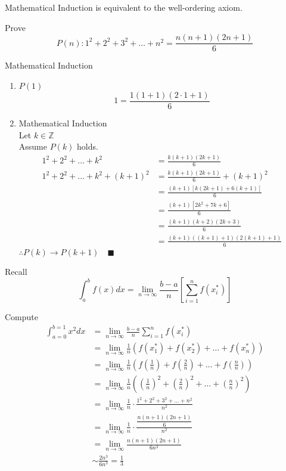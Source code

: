\documentclass[letterpaper, 12pt]{article}
\newenvironment{proof}[1][Proof]{\begin{trivlist}
\item[\hskip \labelsep {\bfseries #1}]}{\end{trivlist}}
\newenvironment{example}[1][Example]{\begin{trivlist}
\item[\hskip \labelsep {\bfseries #1}]}{\end{trivlist}}
\newenvironment{remark}[1][Remark]{\begin{trivlist}
\item[\hskip \labelsep {\bfseries #1}]}{\end{trivlist}}
\newcommand{\qed}{\quad \blacksquare}
\newcommand{\then}{\rightarrow}
\newcommand{\Z}{\mathbb{Z}}
\newcommand{\0}{\emptyset}
\begin{document}
    Mathematical Induction is equivalent to the well-ordering axiom.
    \begin{example}
        Prove
        \[P(n): 1^2 + 2^2 + 3^2 + \dots + n^2 = \frac{n(n + 1)(2n + 1)}{6}\]
    \end{example}
    \begin{proof}
        Mathematical Induction
        \begin{enumerate}
            \item $P(1)$
            \[1 = \frac{1(1 + 1)(2\cdot 1 + 1)}{6}\]
            \item Mathematical Induction \\
            Let $k \in \Z$ \\
            Assume $P(k)$ holds.
            \begin{align*}
                1^2 + 2^2 + \dots + k^2 &= \frac{k(k + 1)(2k + 1)}{6} \\
                1^2 + 2^2 + \dots + k^2 + (k + 1)^2 &= \frac{k(k + 1)(2k + 1)}{6} + (k + 1)^2 \\
                &= \frac{(k + 1)[k(2k + 1) + 6(k + 1)]}{6} \\
                &= \frac{(k + 1)[2k^2 + 7k + 6]}{6} \\
                &= \frac{(k + 1)(k + 2)(2k + 3)}{6} \\
                &= \frac{(k + 1)((k + 1) + 1)(2(k + 1) + 1)}{6}
            \end{align*}
            $\therefore P(k) \then P(k + 1) \qed$
        \end{enumerate}
    \end{proof}
    \begin{remark}
        Recall
        \[\int_{a}^{b} f(x) dx 
        = \lim_{n \to \infty} \frac{b - a}{n}\left[\sum_{i=1}^{n} f(x_i^*)\right]\]
    \end{remark}
    \begin{example}
        Compute
        \begin{align*}
            \int_{a=0}^{b=1} x^2 dx &= \lim_{n \to \infty} \frac{b-a}{n} \sum_{i=1}^{n} f(x_i^*) \\
            &= \lim_{n \to \infty} \frac{1}{n} (f(x_1^*) + f(x_2^*) + \dots + f(x_n^*)) \\
            &= \lim_{n \to \infty} \frac{1}{n} 
            \left(f\left(\frac{1}{n}\right) + f\left(\frac{2}{n}\right) + \dots + f\left(\frac{n}{n}\right)\right) \\
            &= \lim_{n \to \infty} \frac{1}{n} 
            \left(\left(\frac{1}{n}\right)^2 + \left(\frac{2}{n}\right)^2 + \dots + \left(\frac{n}{n}\right)^2\right) \\
            &= \lim_{n \to \infty} \frac{1}{n} \cdot \frac{1^2 + 2^2 + 3^2 + \dots + n^2}{n^2} \\
            &= \lim_{n \to \infty} \frac{1}{n} \cdot \frac{\dfrac{n(n+1)(2n+1)}{6}}{n^2} \\
            &= \lim_{n \to \infty} \frac{n(n+1)(2n+1)}{6n^3} \\
            &\sim \frac{2n^3}{6n^3} = \frac{1}{3}
        \end{align*}
    \end{example}
\end{document}
